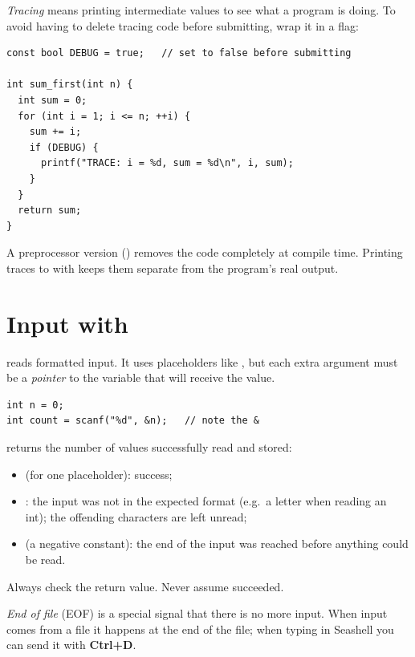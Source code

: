 \emph{Tracing} means printing intermediate values to see what a program is doing. To avoid
having to delete tracing code before submitting, wrap it in a flag:
\begin{lstlisting}[style=c]
const bool DEBUG = true;   // set to false before submitting

int sum_first(int n) {
  int sum = 0;
  for (int i = 1; i <= n; ++i) {
    sum += i;
    if (DEBUG) {
      printf("TRACE: i = %d, sum = %d\n", i, sum);
    }
  }
  return sum;
}
\end{lstlisting}
\begin{aside}
A preprocessor version () removes the code completely at compile
time. Printing traces to  with  keeps them separate from
the program's real output.
\end{aside}

\section{Input with }

 reads formatted input. It uses placeholders like , but each extra
argument must be a \emph{pointer} to the variable that will receive the value.
\begin{lstlisting}[style=c]
int n = 0;
int count = scanf("%d", &n);   // note the &
\end{lstlisting}

\begin{important}
 returns the number of values successfully read and stored:
\begin{itemize}
  \item {} (for one placeholder): success;
  \item {}: the input was not in the expected format (e.g.\ a letter when reading an int);
    the offending characters are left unread;
  \item {} (a negative constant): the end of the input was reached before anything
    could be read.
\end{itemize}
Always check the return value. Never assume  succeeded.
\end{important}

\emph{End of file} (EOF) is a special signal that there is no more input. When input comes from
a file it happens at the end of the file; when typing in Seashell you can send it with
\textbf{Ctrl+D}.

